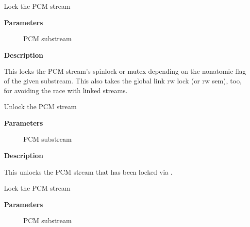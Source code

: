 \documentclass[a4paper,8pt,english]{sphinxmanual}
\begin{document}
\begin{fulllineitems}
\label{sound/kernel-api/alsa-driver-api:c.snd_pcm_stream_lock}
Lock the PCM stream

\end{fulllineitems}


\textbf{Parameters}
\begin{description}
\item[{}] \leavevmode
PCM substream

\end{description}

\textbf{Description}

This locks the PCM stream's spinlock or mutex depending on the nonatomic
flag of the given substream.  This also takes the global link rw lock
(or rw sem), too, for avoiding the race with linked streams.

\begin{fulllineitems}
\label{sound/kernel-api/alsa-driver-api:c.snd_pcm_stream_unlock}
Unlock the PCM stream

\end{fulllineitems}


\textbf{Parameters}
\begin{description}
\item[{}] \leavevmode
PCM substream

\end{description}

\textbf{Description}

This unlocks the PCM stream that has been locked via .

\begin{fulllineitems}
\label{sound/kernel-api/alsa-driver-api:c.snd_pcm_stream_lock_irq}
Lock the PCM stream

\end{fulllineitems}


\textbf{Parameters}
\begin{description}
\item[{}] \leavevmode
PCM substream

\end{description}
\end{document}
